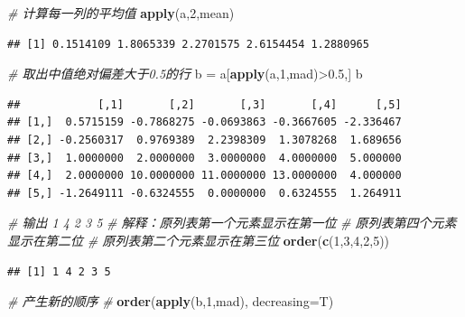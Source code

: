 \documentclass[]{article}
\newenvironment{Shaded}{\begin{snugshade}}{\end{snugshade}}
\newcommand{\KeywordTok}[1]{\textcolor[rgb]{0.13,0.29,0.53}{\textbf{{#1}}}}
\newcommand{\DataTypeTok}[1]{\textcolor[rgb]{0.13,0.29,0.53}{{#1}}}
\newcommand{\DecValTok}[1]{\textcolor[rgb]{0.00,0.00,0.81}{{#1}}}
\newcommand{\FloatTok}[1]{\textcolor[rgb]{0.00,0.00,0.81}{{#1}}}
\newcommand{\StringTok}[1]{\textcolor[rgb]{0.31,0.60,0.02}{{#1}}}
\newcommand{\CommentTok}[1]{\textcolor[rgb]{0.56,0.35,0.01}{\textit{{#1}}}}
\newcommand{\NormalTok}[1]{{#1}}
\numberwithin{figure}{section}
\numberwithin{table}{section}
\theoremstyle{definition}
\theoremstyle{definition}
\theoremstyle{definition}
\theoremstyle{remark}
\begin{document}
\begin{Shaded}
\begin{Highlighting}[]
\CommentTok{# 计算每一列的平均值}
\KeywordTok{apply}\NormalTok{(a,}\DecValTok{2}\NormalTok{,mean)}
\end{Highlighting}
\end{Shaded}

\begin{verbatim}
## [1] 0.1514109 1.8065339 2.2701575 2.6154454 1.2880965
\end{verbatim}

\begin{Shaded}
\begin{Highlighting}[]
\CommentTok{# 取出中值绝对偏差大于0.5的行}
\NormalTok{b =}\StringTok{ }\NormalTok{a[}\KeywordTok{apply}\NormalTok{(a,}\DecValTok{1}\NormalTok{,mad)>}\FloatTok{0.5}\NormalTok{,]}
\NormalTok{b}
\end{Highlighting}
\end{Shaded}

\begin{verbatim}
##            [,1]       [,2]       [,3]       [,4]      [,5]
## [1,]  0.5715159 -0.7868275 -0.0693863 -0.3667605 -2.336467
## [2,] -0.2560317  0.9769389  2.2398309  1.3078268  1.689656
## [3,]  1.0000000  2.0000000  3.0000000  4.0000000  5.000000
## [4,]  2.0000000 10.0000000 11.0000000 13.0000000  4.000000
## [5,] -1.2649111 -0.6324555  0.0000000  0.6324555  1.264911
\end{verbatim}

\begin{Shaded}
\begin{Highlighting}[]
\CommentTok{# 输出 1 4 2 3 5}
\CommentTok{# 解释：原列表第一个元素显示在第一位}
\CommentTok{#       原列表第四个元素显示在第二位}
\CommentTok{#       原列表第二个元素显示在第三位}
\KeywordTok{order}\NormalTok{(}\KeywordTok{c}\NormalTok{(}\DecValTok{1}\NormalTok{,}\DecValTok{3}\NormalTok{,}\DecValTok{4}\NormalTok{,}\DecValTok{2}\NormalTok{,}\DecValTok{5}\NormalTok{))}
\end{Highlighting}
\end{Shaded}

\begin{verbatim}
## [1] 1 4 2 3 5
\end{verbatim}

\begin{Shaded}
\begin{Highlighting}[]
\CommentTok{# 产生新的顺序}
\CommentTok{# }
\KeywordTok{order}\NormalTok{(}\KeywordTok{apply}\NormalTok{(b,}\DecValTok{1}\NormalTok{,mad), }\DataTypeTok{decreasing=}\NormalTok{T)}
\end{Highlighting}
\end{Shaded}
\end{document}
